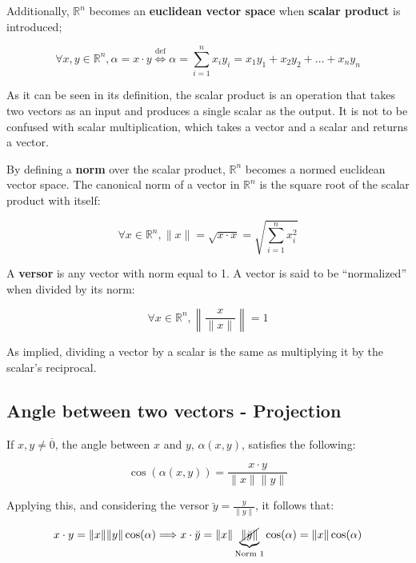 \documentclass{article}
\renewcommand{\Bbb}{\mathbb}
\begin{document}
Additionally, $\Bbb R^n$ becomes an \textbf{euclidean vector space} when \textbf{scalar product} is introduced;

\begin{equation}
\forall x, y \in \Bbb R^n, \alpha = x \cdot y \overset{\text{def}}{\Longleftrightarrow} \alpha = \sum\limits_{i=1}^{n} x_i y_i = x_1 y_1 + x_2 y_2 + \ldots + x_n y_n
\end{equation}

As it can be seen in its definition, the scalar product is an operation that takes two vectors as an input and produces a single scalar as the output. It is not to be confused with scalar multiplication, which takes a vector and a scalar and returns a vector.

By defining a \textbf{norm} over the scalar product, $\Bbb R^n$ becomes a normed euclidean vector space. The canonical norm of a vector in $\Bbb R^n$ is the square root of the scalar product with itself:

\begin{equation}
\forall x \in \Bbb R^n, \|x\| = \sqrt{x \cdot x} = \sqrt{ \sum\limits_{i=1}^{n} x_i^2 }
\end{equation}

A \textbf{versor} is any vector with norm equal to 1. A vector is said to be ``normalized'' when divided by its norm:

\begin{equation}
\forall x \in \Bbb R^n, \left\| \frac{x}{\|x\|} \right\| = 1
\end{equation}

As implied, dividing a vector by a scalar is the same as multiplying it by the scalar's reciprocal.

\subsection{Angle between two vectors - Projection}

If $x, y \neq \overline{0}$, the angle between $x$ and $y$, $\alpha(x,y)$, satisfies the following:

\begin{equation}
\cos (\alpha(x, y)) = \frac{x \cdot y}{ \|x\| \|y\| }
\end{equation}

Applying this, and considering the versor $\breve{y} = \frac{y}{\|y\|}$, it follows that:

\begin{equation}
x \cdot y = \|x\| \|y\| \cos(\alpha) \Longrightarrow x \cdot \breve{y} = \|x\| \underbrace{ \cancel{ \| \breve{y} \| } }_{\text{Norm 1}} \cos(\alpha) = \|x\| \cos(\alpha)
\end{equation}
\end{document}
